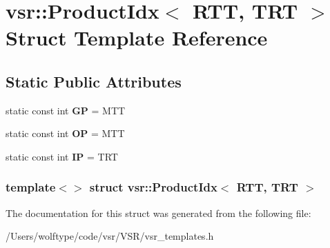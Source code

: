 \hypertarget{structvsr_1_1_product_idx_3_01_r_t_t_00_01_t_r_t_01_4}{\section{vsr\-:\-:Product\-Idx$<$ R\-T\-T, T\-R\-T $>$ Struct Template Reference}
\label{structvsr_1_1_product_idx_3_01_r_t_t_00_01_t_r_t_01_4}
}
\subsection*{Static Public Attributes}
\begin{DoxyCompactItemize}
\item 
\hypertarget{structvsr_1_1_product_idx_3_01_r_t_t_00_01_t_r_t_01_4_a8fbd7f614b2795d76cc930655bb887af}{static const int {\bfseries G\-P} = M\-T\-T}\label{structvsr_1_1_product_idx_3_01_r_t_t_00_01_t_r_t_01_4_a8fbd7f614b2795d76cc930655bb887af}

\item 
\hypertarget{structvsr_1_1_product_idx_3_01_r_t_t_00_01_t_r_t_01_4_a26f265844826244c629a287896be6afe}{static const int {\bfseries O\-P} = M\-T\-T}\label{structvsr_1_1_product_idx_3_01_r_t_t_00_01_t_r_t_01_4_a26f265844826244c629a287896be6afe}

\item 
\hypertarget{structvsr_1_1_product_idx_3_01_r_t_t_00_01_t_r_t_01_4_a56b772049b527c157ccbc55cc41ba2e5}{static const int {\bfseries I\-P} = T\-R\-T}\label{structvsr_1_1_product_idx_3_01_r_t_t_00_01_t_r_t_01_4_a56b772049b527c157ccbc55cc41ba2e5}

\end{DoxyCompactItemize}
\subsubsection*{template$<$$>$ struct vsr\-::\-Product\-Idx$<$ R\-T\-T, T\-R\-T $>$}



The documentation for this struct was generated from the following file\-:\begin{DoxyCompactItemize}
\item 
/\-Users/wolftype/code/vsr/\-V\-S\-R/vsr\-\_\-templates.\-h\end{DoxyCompactItemize}
